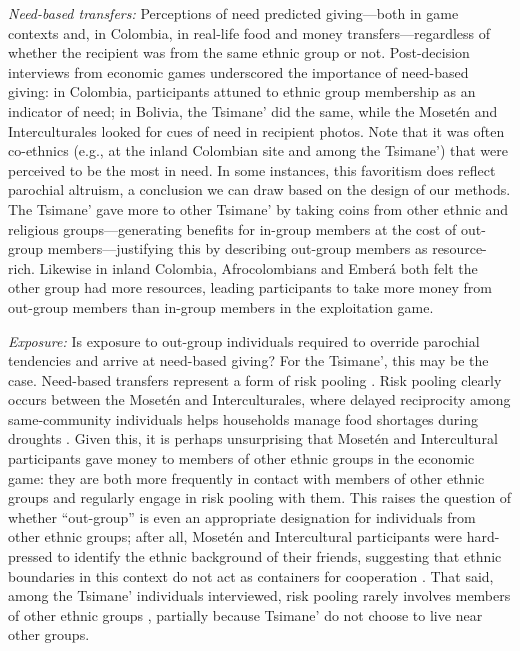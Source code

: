 \documentclass[bibauthoryear]{aa}
\begin{document}
\emph{Need-based transfers:} Perceptions of need predicted giving---both in game contexts and, in  Colombia, in real-life food and money transfers---regardless of whether the recipient was from the same ethnic group or not. Post-decision interviews from economic games underscored the importance of need-based giving: in Colombia, participants attuned to ethnic group membership as an indicator of need; in Bolivia, the Tsimane' did the same, while the Moset\'en and Interculturales looked for cues of need in recipient photos. Note that it was often co-ethnics (e.g., at the inland Colombian site and among the Tsimane') that were perceived to be the most in need. In some instances, this favoritism does reflect parochial altruism, a conclusion we can draw based on the design of our methods. The Tsimane' gave more to other Tsimane' by taking coins from other ethnic and religious groups---generating benefits for in-group members at the cost of out-group members---justifying this by describing out-group members as resource-rich. Likewise in inland Colombia, Afrocolombians and Ember\'a both felt the other group had more resources, leading  participants to take more money from out-group members than in-group members in the exploitation game.  

\emph{Exposure:} Is exposure to out-group individuals required to override parochial tendencies and arrive at need-based giving? For the Tsimane', this may be the case. Need-based transfers represent a form of risk pooling \citep{cronk2019managing}. Risk pooling clearly occurs between the Moset\'en and Interculturales, where delayed reciprocity among same-community individuals helps households manage food shortages during droughts \citep{pisorjones2020}. Given this, it is perhaps unsurprising that Moset\'en and Intercultural participants gave money to members of other ethnic groups in the economic game: they are both more frequently in contact with members of other ethnic groups and regularly engage in risk pooling with them. This raises the question of whether ``out-group'' is even an appropriate designation for individuals from other ethnic groups; after all, Moset\'en and Intercultural participants were hard-pressed to identify the ethnic background of their friends, suggesting that ethnic boundaries in this context do not act as containers for cooperation  \citep[e.g.,][]{brewer1976ethnocentrism, moya2015different}. That said, among the Tsimane' individuals interviewed, risk pooling rarely involves members of other ethnic groups  \citep[see also][]{jaeggi2016reciprocal}, partially because Tsimane' do not choose to live near other groups. %
\end{document}
